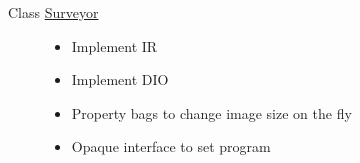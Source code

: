 \label{todo__todo000001}
\hypertarget{todo__todo000001}{}
 \begin{description}
\item[Class \hyperlink{classSurveyor}{Surveyor} ]\begin{itemize}
\item Implement IR\item Implement DIO\item Property bags to change image size on the fly\item Opaque interface to set program\end{itemize}


\end{description}
